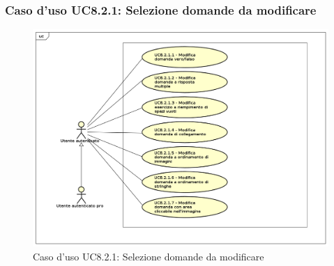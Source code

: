 		\subsubsection{Caso d'uso UC8.2.1: Selezione domande da modificare}
		\label{UC8.2.1}
		\begin{figure}[h]
			\centering
			\includegraphics[scale=0.46,keepaspectratio]{UML/UC8_2_1.png}
			\caption{Caso d'uso UC8.2.1: Selezione domande da modificare}
		\end{figure}
		\FloatBarrier
